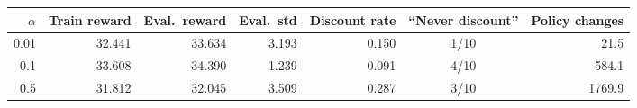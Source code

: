 \begin{tabular}{rrrrrcr}
\toprule
$\alpha$ & Train reward & Eval.\ reward & Eval.\ std & Discount rate & ``Never discount'' & Policy changes \\
\midrule
0.01 & 32.441 & 33.634 & 3.193 & 0.150 & 1/10 & 21.5 \\
0.1 & 33.608 & 34.390 & 1.239 & 0.091 & 4/10 & 584.1 \\
0.5 & 31.812 & 32.045 & 3.509 & 0.287 & 3/10 & 1769.9 \\
\bottomrule
\end{tabular}
